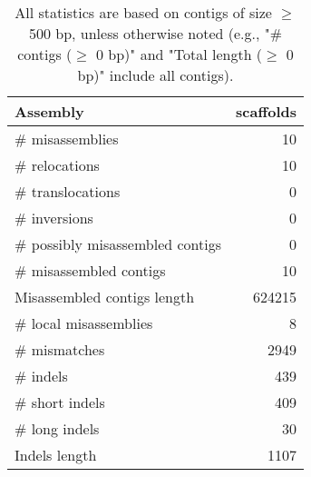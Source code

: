 \documentclass[12pt,a4paper]{article}
\begin{document}
\begin{table}[ht]
\begin{center}
\caption{All statistics are based on contigs of size $\geq$ 500 bp, unless otherwise noted (e.g., "\# contigs ($\geq$ 0 bp)" and "Total length ($\geq$ 0 bp)" include all contigs).}
\begin{tabular}{|l*{1}{|r}|}
\hline
Assembly & scaffolds \\ \hline
\# misassemblies & 10 \\ \hline
\hspace{5mm}\# relocations & 10 \\ \hline
\hspace{5mm}\# translocations & 0 \\ \hline
\hspace{5mm}\# inversions & 0 \\ \hline
\# possibly misassembled contigs & 0 \\ \hline
\# misassembled contigs & 10 \\ \hline
Misassembled contigs length & 624215 \\ \hline
\# local misassemblies & 8 \\ \hline
\# mismatches & 2949 \\ \hline
\# indels & 439 \\ \hline
\hspace{5mm}\# short indels & 409 \\ \hline
\hspace{5mm}\# long indels & 30 \\ \hline
Indels length & 1107 \\ \hline
\end{tabular}
\end{center}
\end{table}
\end{document}

